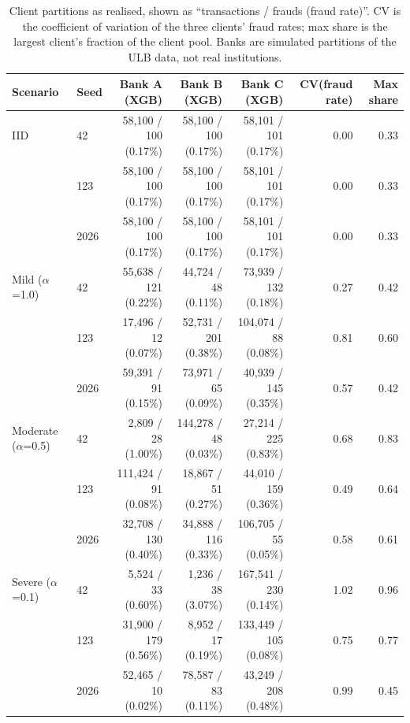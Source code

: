 \begin{table}[t]
\centering
\scriptsize
\caption{Client partitions as realised, shown as ``transactions / frauds (fraud rate)''. CV is the coefficient of variation of the three clients' fraud rates; max share is the largest client's fraction of the client pool. Banks are simulated partitions of the ULB data, not real institutions.}
\label{tab:data}
\begin{tabular}{llrrrrr}
\toprule
Scenario & Seed & Bank A (XGB) & Bank B (XGB) & Bank C (XGB) & CV(fraud rate) & Max share \\
\midrule
IID & 42 & 58{,}100 / 100 (0.17\%) & 58{,}100 / 100 (0.17\%) & 58{,}101 / 101 (0.17\%) & 0.00 & 0.33 \\
 & 123 & 58{,}100 / 100 (0.17\%) & 58{,}100 / 100 (0.17\%) & 58{,}101 / 101 (0.17\%) & 0.00 & 0.33 \\
 & 2026 & 58{,}100 / 100 (0.17\%) & 58{,}100 / 100 (0.17\%) & 58{,}101 / 101 (0.17\%) & 0.00 & 0.33 \\
\midrule
Mild ($\alpha$=1.0) & 42 & 55{,}638 / 121 (0.22\%) & 44{,}724 / 48 (0.11\%) & 73{,}939 / 132 (0.18\%) & 0.27 & 0.42 \\
 & 123 & 17{,}496 / 12 (0.07\%) & 52{,}731 / 201 (0.38\%) & 104{,}074 / 88 (0.08\%) & 0.81 & 0.60 \\
 & 2026 & 59{,}391 / 91 (0.15\%) & 73{,}971 / 65 (0.09\%) & 40{,}939 / 145 (0.35\%) & 0.57 & 0.42 \\
\midrule
Moderate ($\alpha$=0.5) & 42 & 2{,}809 / 28 (1.00\%) & 144{,}278 / 48 (0.03\%) & 27{,}214 / 225 (0.83\%) & 0.68 & 0.83 \\
 & 123 & 111{,}424 / 91 (0.08\%) & 18{,}867 / 51 (0.27\%) & 44{,}010 / 159 (0.36\%) & 0.49 & 0.64 \\
 & 2026 & 32{,}708 / 130 (0.40\%) & 34{,}888 / 116 (0.33\%) & 106{,}705 / 55 (0.05\%) & 0.58 & 0.61 \\
\midrule
Severe ($\alpha$=0.1) & 42 & 5{,}524 / 33 (0.60\%) & 1{,}236 / 38 (3.07\%) & 167{,}541 / 230 (0.14\%) & 1.02 & 0.96 \\
 & 123 & 31{,}900 / 179 (0.56\%) & 8{,}952 / 17 (0.19\%) & 133{,}449 / 105 (0.08\%) & 0.75 & 0.77 \\
 & 2026 & 52{,}465 / 10 (0.02\%) & 78{,}587 / 83 (0.11\%) & 43{,}249 / 208 (0.48\%) & 0.99 & 0.45 \\
\bottomrule
\end{tabular}
\end{table}
